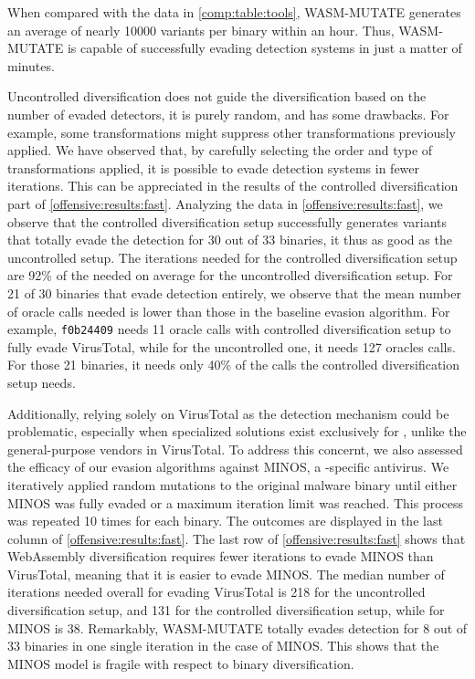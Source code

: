 \begin{tcolorbox}[title=Takeaway,boxrule=1pt,arc=.2em,boxsep=1.0mm]
    When compared with the data in \autoref{comp:table:tools},   WASM-MUTATE generates an average of nearly 10000 variants per binary within an hour. 
    Thus, WASM-MUTATE is capable of successfully evading detection systems in just a matter of minutes.
\end{tcolorbox}

  Uncontrolled diversification does not guide the diversification based on the number of evaded detectors, it is purely random, and has some drawbacks.
For example, some transformations might suppress other transformations previously applied.
We have observed that, by carefully selecting the order and type of transformations applied, it is possible to evade detection systems in fewer iterations.
This can be appreciated in the results of the controlled diversification part of \autoref{offensive:results:fast}.
Analyzing the data in \autoref{offensive:results:fast}, we observe that the controlled diversification setup successfully generates variants that totally evade the detection for 30 out of 33 binaries, it thus as good as the uncontrolled setup.
The iterations needed for the controlled diversification setup are 92\% of the needed on average for the uncontrolled diversification setup.
For 21 of 30 binaries that evade detection entirely, we observe that the mean number of oracle calls needed is lower than those in the baseline evasion algorithm.
For example, \texttt{f0b24409} needs 11 oracle calls with controlled diversification setup to fully evade VirusTotal, while for the uncontrolled one, it needs 127 oracles calls.
For those 21 binaries, it needs only 40\% of the calls the controlled diversification setup needs.

Additionally, relying solely on VirusTotal as the detection mechanism could be problematic, especially when specialized solutions exist exclusively for \Wasm, unlike the general-purpose vendors in VirusTotal. 
To address this concernt, we also assessed the efficacy of our evasion algorithms against MINOS, a \Wasm-specific antivirus. 
We iteratively applied random mutations to the original malware binary until either MINOS was fully evaded or a maximum iteration limit was reached. 
This process was repeated 10 times for each binary. 
The outcomes are displayed in the last column of \autoref{offensive:results:fast}.
The last row of \autoref{offensive:results:fast} shows that WebAssembly diversification requires fewer iterations to evade MINOS than VirusTotal, meaning that it is easier to evade MINOS.
The median number of iterations needed overall for evading VirusTotal is 218 for the uncontrolled diversification setup, and 131 for the controlled diversification setup, while for MINOS is 38.
Remarkably, WASM-MUTATE totally evades detection for 8 out of 33 binaries in one single iteration in the case of MINOS.
This shows that the MINOS model is fragile with respect to binary diversification. 



